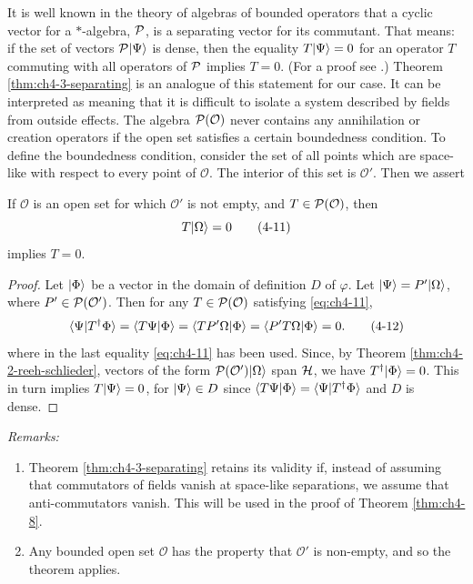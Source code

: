 It is well known in the theory of algebras of bounded operators that a cyclic
vector for a $*$-algebra, $\mathcal{P}$, is a separating vector for its
commutant. That means: if the set of vectors $\mathcal{P}\lvert \Psi\rangle$ is
dense, then the equality $T\lvert \Psi\rangle=0$ for an operator $T$ commuting with
all operators of $\mathcal{P}$ implies $T=0$. (For a proof see
\cite{ch4-4}.)
Theorem \ref{thm:ch4-3-separating} is an analogue of this statement for our case. It can be
interpreted as meaning that it is difficult to isolate a system described by
fields from outside effects. The algebra $\mathcal{P}(\mathcal O)$
never contains any annihilation or creation operators if the open set
satisfies a certain boundedness condition. To define the boundedness
condition, consider the set of all points which are space-like with respect to
every point of $\mathcal O$. The interior of this set is $\mathcal O'$. Then
we assert

\begin{theorem}[4-3]\label{thm:ch4-3-separating}
If $\mathcal O$ is an open set for which $\mathcal O'$ is not empty, and
$T\in\mathcal{P}(\mathcal O)$, then
\begin{equation}
  T\lvert \Omega\rangle=0
  \tag{4-11}\label{eq:ch4-11}
\end{equation}
implies $T=0$.

\begin{proof}
Let $\lvert \Phi\rangle$ be a vector in the domain of definition $D$ of $\varphi$.
Let $\lvert \Psi\rangle=P'\lvert \Omega\rangle$, where
$P'\in\mathcal{P}(\mathcal O')$. Then for any
$T\in\mathcal{P}(\mathcal O)$ satisfying \eqref{eq:ch4-11},
\begin{equation}
  \langle \Psi\vert T^\dagger\Phi\rangle
  =\langle T\Psi\vert \Phi\rangle
  =\langle TP'\Omega\vert \Phi\rangle
  =\langle P'T\Omega\vert \Phi\rangle=0.
  \tag{4-12}\label{eq:ch4-12}
\end{equation}
where in the last equality \eqref{eq:ch4-11} has been used. Since, by Theorem \ref{thm:ch4-2-reeh-schlieder},
vectors of the form $\mathcal{P}(\mathcal O')\lvert \Omega\rangle$ span
$\mathcal{H}$, we have $T^\dagger\lvert \Phi\rangle=0$. This in turn implies
$T\lvert \Psi\rangle=0$, for $\lvert \Psi\rangle\in D$ since
$\langle T\Psi\vert \Phi\rangle=\langle \Psi\vert T^\dagger\Phi\rangle$ and $D$ is dense.
\end{proof}
\end{theorem}

\emph{Remarks:}

\begin{enumerate}
\item Theorem \ref{thm:ch4-3-separating} retains its validity if, instead of assuming that
commutators of fields vanish at space-like separations, we assume that
anti-commutators vanish. This will be used in the proof of Theorem \ref{thm:ch4-8}.

\item Any bounded open set $\mathcal O$ has the property that $\mathcal O'$ is
non-empty, and so the theorem applies.
\end{enumerate}

